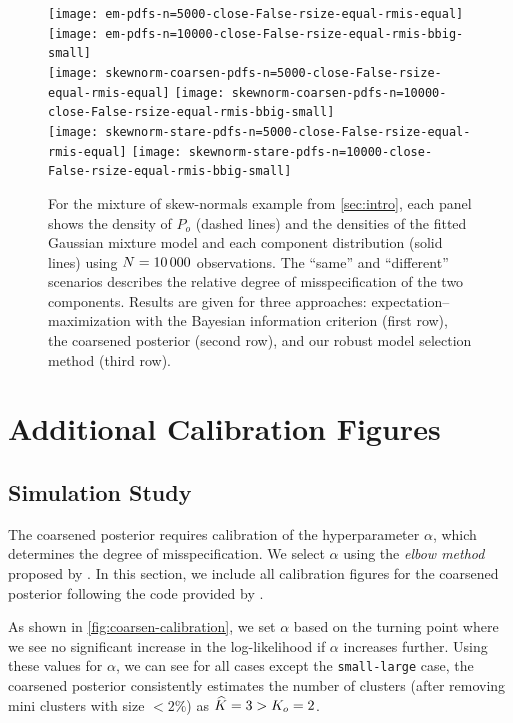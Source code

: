 \begin{figure}[tp]
	\centering
	\texttt{[image: em-pdfs-n=5000-close-False-rsize-equal-rmis-equal]}
	\texttt{[image: em-pdfs-n=10000-close-False-rsize-equal-rmis-bbig-small]}\\
	\texttt{[image: skewnorm-coarsen-pdfs-n=5000-close-False-rsize-equal-rmis-equal]}
	\texttt{[image: skewnorm-coarsen-pdfs-n=10000-close-False-rsize-equal-rmis-bbig-small]}\\
	\texttt{[image: skewnorm-stare-pdfs-n=5000-close-False-rsize-equal-rmis-equal]}
	\texttt{[image: skewnorm-stare-pdfs-n=10000-close-False-rsize-equal-rmis-bbig-small]}
	\caption{
		For the mixture of skew-normals example from \cref{sec:intro},
		each panel shows the density of $P_{o}$ (dashed lines) and the densities of the fitted Gaussian mixture model and each
		component distribution (solid lines) using $N = 10\,000$ observations.
		The ``same'' and ``different'' scenarios describes the relative degree of misspecification of the two components.
		Results are given for three approaches:
		expectation--maximization with the Bayesian information criterion (first row),
		the coarsened posterior (second row),
		and our robust model selection method (third row).}
	\label{fig:motivate-comparison}
\end{figure}


\section{Additional Calibration Figures}

\subsection{Simulation Study}
\label{appx:simulation-gauss}

The coarsened posterior requires calibration of the hyperparameter $\alpha$, which determines the degree of misspecification.
We select $\alpha$ using the \emph{elbow method} proposed by \citet{Miller:2019}.
In this section, we include all calibration figures for the coarsened posterior following the code provided by \citet{Miller:2019}.

As shown in \cref{fig:coarsen-calibration}, we set $\alpha$ based on the turning point where we see no significant increase
in the log-likelihood if $\alpha$ increases further.
Using these values for $\alpha$, we can see for all cases except the \texttt{small-large} case, the coarsened posterior consistently estimates the number of clusters (after removing mini clusters with size $<2\%$) as $\widehat{K} = 3 > K_{o} = 2$.

